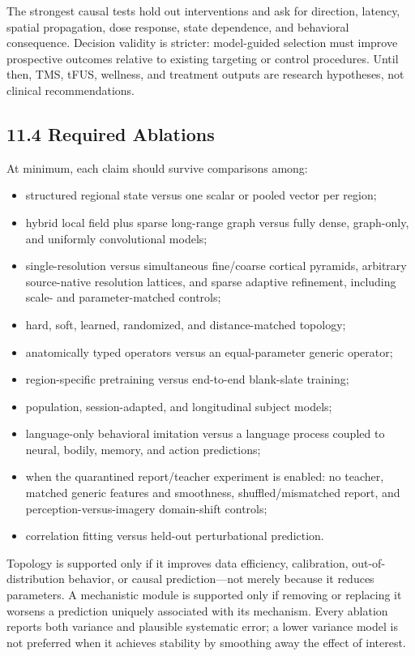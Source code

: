The strongest causal tests hold out interventions and ask for direction,
latency, spatial propagation, dose response, state dependence, and behavioral
consequence. Decision validity is stricter: model-guided selection must improve
prospective outcomes relative to existing targeting or control procedures.
Until then, TMS, tFUS, wellness, and treatment outputs are research hypotheses,
not clinical recommendations.

\subsection{11.4 Required Ablations}

At minimum, each claim should survive comparisons among:

\begin{itemize}
\item structured regional state versus one scalar or pooled vector per region;
\item hybrid local field plus sparse long-range graph versus fully dense,
  graph-only, and uniformly convolutional models;
\item single-resolution versus simultaneous fine/coarse cortical pyramids,
  arbitrary source-native resolution lattices, and sparse adaptive refinement,
  including scale- and parameter-matched controls;
\item hard, soft, learned, randomized, and distance-matched topology;
\item anatomically typed operators versus an equal-parameter generic operator;
\item region-specific pretraining versus end-to-end blank-slate training;
\item population, session-adapted, and longitudinal subject models;
\item language-only behavioral imitation versus a language process coupled to
  neural, bodily, memory, and action predictions;
\item when the quarantined report/teacher experiment is enabled: no teacher,
  matched generic features and smoothness, shuffled/mismatched report, and
  perception-versus-imagery domain-shift controls;
\item correlation fitting versus held-out perturbational prediction.
\end{itemize}

Topology is supported only if it improves data efficiency, calibration,
out-of-distribution behavior, or causal prediction---not merely because it
reduces parameters. A mechanistic module is supported only if removing or
replacing it worsens a prediction uniquely associated with its mechanism.
Every ablation reports both variance and plausible systematic error; a lower
variance model is not preferred when it achieves stability by smoothing away
the effect of interest.

